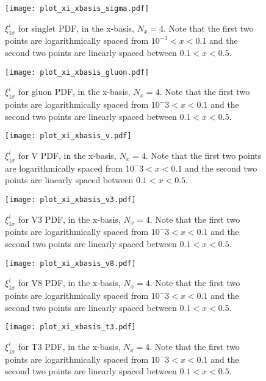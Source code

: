 \begin{figure}
    \centering
    \texttt{[image: plot\_xi\_xbasis\_sigma.pdf]}
    \caption{
        $\xi^{i}_{1\sigma}$ for singlet PDF, in the x-basis, $N_x=4$. Note that
        the first two points are logarithmically spaced from $10^{-3} < x < 0.1$
        and the second two points are linearly spaced between $0.1 < x < 0.5$.}
    \label{fig:pdfxisinglet}
\end{figure}

\begin{figure}
    \centering
    \texttt{[image: plot\_xi\_xbasis\_gluon.pdf]}
    \caption{
        $\xi^{i}_{1\sigma}$ for gluon PDF, in the x-basis, $N_x=4$. Note that
        the first two points are logarithmically spaced from $10^-3 < x < 0.1$
        and the second two points are linearly spaced between $0.1 < x < 0.5$.
    }
    \label{fig:pdfxigluon}
\end{figure}

\begin{figure}
    \centering
    \texttt{[image: plot\_xi\_xbasis\_v.pdf]}
    \caption{
        $\xi^{i}_{1\sigma}$ for V PDF, in the x-basis, $N_x=4$. Note that
        the first two points are logarithmically spaced from $10^-3 < x < 0.1$
        and the second two points are linearly spaced between $0.1 < x < 0.5$.
    }
    \label{fig:pdfxiv}
\end{figure}

\begin{figure}
    \centering
    \texttt{[image: plot\_xi\_xbasis\_v3.pdf]}
    \caption{
        $\xi^{i}_{1\sigma}$ for V3 PDF, in the x-basis, $N_x=4$. Note that
        the first two points are logarithmically spaced from $10^-3 < x < 0.1$
        and the second two points are linearly spaced between $0.1 < x < 0.5$.
    }
    \label{fig:pdfxiv3}
\end{figure}

\begin{figure}
    \centering
    \texttt{[image: plot\_xi\_xbasis\_v8.pdf]}
    \caption{
        $\xi^{i}_{1\sigma}$ for V8 PDF, in the x-basis, $N_x=4$. Note that
        the first two points are logarithmically spaced from $10^-3 < x < 0.1$
        and the second two points are linearly spaced between $0.1 < x < 0.5$.
    }
    \label{fig:pdfxiv8}
\end{figure}

\begin{figure}
    \centering
    \texttt{[image: plot\_xi\_xbasis\_t3.pdf]}
    \caption{
        $\xi^{i}_{1\sigma}$ for T3 PDF, in the x-basis, $N_x=4$. Note that
        the first two points are logarithmically spaced from $10^-3 < x < 0.1$
        and the second two points are linearly spaced between $0.1 < x < 0.5$.
    }
    \label{fig:pdfxit3}
\end{figure}

